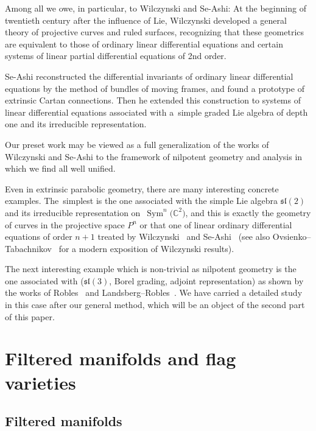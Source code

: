 \documentclass[10pt,a4paper]{amsart}
\newcommand{\Sym}{\operatorname{Sym}}
\numberwithin{equation}{section}
\begin{document}
Among all we owe, in particular, to Wilczynski and Se-Ashi:
At the beginning of twentieth century after the influence of Lie, Wilczynski developed a general theory of projective curves and ruled surfaces, recognizing that these geometrics are equivalent to those of ordinary linear differential equations and certain systems of linear partial differential equations of 2nd order.

Se-Ashi reconstructed the differential invariants of ordinary linear differential equations by the method of bundles of moving frames, and found a prototype of extrinsic Cartan connections.
Then he extended this construction to systems of linear differential equations associated with a~simple graded Lie algebra of depth one and its irreducible representation.

Our preset work may be viewed as a full generalization of the works of Wilczynski and Se-Ashi to the framework of nilpotent geometry and analysis in which we find all well unified.

Even in extrinsic parabolic geometry, there are many interesting concrete examples. The~sim\-plest is the one associated with the simple Lie algebra $\mathfrak{sl}(2)$ and its irreducible representation on~$\Sym^n\big(\mathbb C^2\big)$, and this is exactly the geometry of curves in the projective space $P^n$ or that one of linear ordinary differential equations of order $n+1$ treated by Wilczynski~\cite{wilch} and Se-Ashi~\cite{se1,se2} (see also Ovsienko--Tabachnikov~\cite{O-T} for a modern exposition of Wilczynski results).

The next interesting example which is non-trivial as nilpotent geometry is the one associated with ($\mathfrak{sl}(3)$, Borel grading, adjoint representation) as shown by the works of Robles~\cite{robles} and Landsberg--Robles~\cite{landrob}. We have carried a detailed study in this case after our general method,
which will be an object of the second part of this paper.

\section{Filtered manifolds and flag varieties}\label{sec2}

\subsection{Filtered manifolds}
\end{document}

